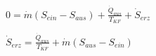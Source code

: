 \( 0 = \dot{m} (S_{ein} - S_{aus}) + \frac{\dot{Q}_{aus}}{T_{KF}} + \dot{S}_{erz} \)  

\( \dot{S}_{erz} = \frac{\dot{Q}_{aus}}{T_{KF}} + \dot{m} (S_{aus} - S_{ein}) \)
